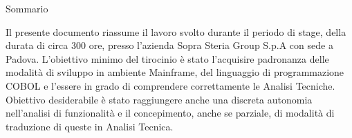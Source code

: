 
\cleardoublepage
{}
{}
\begingroup
\let\clearpage\relax
\let\cleardoublepage\relax
\let\cleardoublepage\relax


\thispagestyle{plain}

\leavevmode	\newline
\leavevmode	\newline
\leavevmode	\newline
\begin{Huge}
Sommario
\end{Huge}
\leavevmode	\newline

Il presente documento riassume il lavoro svolto durante il periodo di stage, della durata di circa 300 ore, presso l’azienda Sopra Steria Group S.p.A con sede a Padova.
L'obiettivo minimo del tirocinio è stato l'acquisire padronanza delle modalità di sviluppo in ambiente Mainframe, del linguaggio di programmazione COBOL e l'essere in grado di comprendere correttamente le Analisi Tecniche.
Obiettivo desiderabile è stato raggiungere anche una discreta autonomia nell'analisi di funzionalità e il concepimento, anche se parziale, di modalità di traduzione di queste in Analisi Tecnica.
\endgroup

\leavevmode	\newline
\leavevmode	\newline
\leavevmode	\newline

